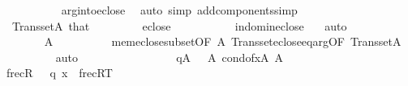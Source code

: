 \begin{isabellebody}
\ \ \ \ \ \ \ \ \isamarkupfalse%
\ \ arg{\isacharunderscore}{\kern0pt}into{\isacharunderscore}{\kern0pt}eclose\ \isamarkupfalse%
\ {\isacharparenleft}{\kern0pt}auto\ simp\ add{\isacharcolon}{\kern0pt}components{\isacharunderscore}{\kern0pt}simp{\isacharparenright}{\kern0pt}\isanewline
\ \ \ \ \ \ \isamarkupfalse%
\ \ {\isacartoucheopen}Transset{\isacharparenleft}{\kern0pt}A{}{\isacharparenright}{\kern0pt}{\isacartoucheclose}\ that{\isacharparenleft}{\kern0pt}{}{\isacharparenright}{\kern0pt}\isanewline
\ \ \ \ \ \ \isamarkupfalse%
\ {\isachardoublequoteopen}{\isasymsigma}{\isasymin}\ eclose{\isacharparenleft}{\kern0pt}{\isacharquery}{\kern0pt}{\isasymtheta}{\isacharparenright}{\kern0pt}{\isachardoublequoteclose}\ \isanewline
\ \ \ \ \ \ \ \ \isamarkupfalse%
\ in{\isacharunderscore}{\kern0pt}dom{\isacharunderscore}{\kern0pt}in{\isacharunderscore}{\kern0pt}eclose\ \ \isamarkupfalse%
\ auto\isanewline
\ \ \ \ \ \ \isamarkupfalse%
\isanewline
\ \ \ \ \ \ \isamarkupfalse%
\ {\isachardoublequoteopen}{\isasymsigma}{\isasymin}A{}{\isachardoublequoteclose}\isanewline
\ \ \ \ \ \ \ \ \isamarkupfalse%
\ mem{\isacharunderscore}{\kern0pt}eclose{\isacharunderscore}{\kern0pt}subset{\isacharbrackleft}{\kern0pt}OF\ {\isacartoucheopen}{\isacharquery}{\kern0pt}{\isasymtheta}{\isasymin}A{}{\isacartoucheclose}{\isacharbrackright}{\kern0pt}\ Transset{\isacharunderscore}{\kern0pt}eclose{\isacharunderscore}{\kern0pt}eq{\isacharunderscore}{\kern0pt}arg{\isacharbrackleft}{\kern0pt}OF\ {\isacartoucheopen}Transset{\isacharparenleft}{\kern0pt}A{}{\isacharparenright}{\kern0pt}{\isacartoucheclose}{\isacharbrackright}{\kern0pt}\ \isanewline
\ \ \ \ \ \ \ \ \isamarkupfalse%
\ auto\ \ \ \ \ \ \ \ \ \isanewline
\ \ \ \ \ \ \isamarkupfalse%
\ {\isacartoucheopen}q{\isasymin}A{}{\isacartoucheclose}\ {\isacartoucheopen}{\isacharquery}{\kern0pt}{\isasymtheta}\ {\isasymin}\ A{}{\isacartoucheclose}\ {\isacartoucheopen}cond{\isacharunderscore}{\kern0pt}of{\isacharparenleft}{\kern0pt}x{\isacharparenright}{\kern0pt}{\isasymin}A{}{\isacartoucheclose}\ {\isacartoucheopen}{\isacharquery}{\kern0pt}{\isasymtau}{\isasymin}A{}{\isacartoucheclose}\isanewline
\ \ \ \ \ \ \isamarkupfalse%
\ {\isachardoublequoteopen}frecR{\isacharparenleft}{\kern0pt}{\isasymlangle}{}{\isacharcomma}{\kern0pt}\ {\isacharquery}{\kern0pt}{\isasymtau}{\isacharcomma}{\kern0pt}\ {\isasymsigma}{\isacharcomma}{\kern0pt}\ q{\isasymrangle}{\isacharcomma}{\kern0pt}\ x{\isacharparenright}{\kern0pt}{\isachardoublequoteclose}\ {\isacharparenleft}{\kern0pt}\ {\isachardoublequoteopen}frecR{\isacharparenleft}{\kern0pt}{\isacharquery}{\kern0pt}T{\isacharcomma}{\kern0pt}{\isacharunderscore}{\kern0pt}{\isacharparenright}{\kern0pt}{\isachardoublequoteclose}{\isacharparenright}{\kern0pt}\isanewline

\end{isabellebody}
